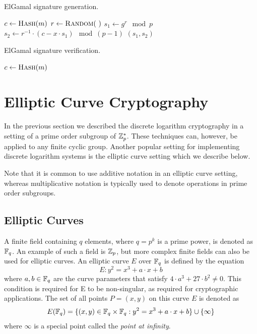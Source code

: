 \begin{algorithm}
  \caption{ElGamal signature generation.}
  \label{alg:ElGamal-sign}
  \addtolength{\baselineskip}{1mm}
  \begin{algorithmic}[1]
      \State $c \gets \Call{Hash}{m}$
      \State $r \gets \Call{Random}{~}$
      \State $s_1 \gets g^r \mod p$
      \State $s_2 \gets r^{-1} \cdot (c - x \cdot s_1) \mod (p - 1)$
      \Return $(s_1, s_2)$
    \EndFunction
  \end{algorithmic}
\end{algorithm}
\begin{algorithm}
  \caption{ElGamal signature verification.}
  \label{alg:ElGamal-verify}
  \addtolength{\baselineskip}{1mm}
  \begin{algorithmic}[1]
      \State $c \gets \Call{Hash}{m}$
        \Return {}
      \EndIf
      \Return {}
    \EndFunction
  \end{algorithmic}
\end{algorithm}

\section{Elliptic Curve Cryptography}

In the previous section we described the discrete logarithm cryptography in a
setting of a prime order subgroup of $\mathbb{Z}^*_p$. These techniques can, however,
be applied to any finite cyclic group. Another popular setting for implementing
discrete logarithm systems is the elliptic curve setting which we describe below.

Note that it is common to use additive notation in an elliptic curve setting,
whereas multiplicative notation is typically used to denote operations in prime
order subgroups.

\subsection{Elliptic Curves}

A finite field containing $q$ elements, where $q = p^k$ is a prime power, is
denoted as $\mathbb{F}_{q}$. An example of such a field is $\mathbb{Z}_p$, but more complex
finite fields can also be used for elliptic curves. An elliptic curve $E$ over
$\mathbb{F}_{q}$ is defined by the equation
\begin{equation}\label{eqn:elliptic_curve}
  E: y^2 = x^3 + a \cdot x + b
\end{equation}
where $a, b \in \mathbb{F}_{q}$ are the curve parameters that satisfy
$4 \cdot a^3 + 27 \cdot b^2 \neq 0$. This condition is required for E to be
non-singular, as required for cryptographic applications. The set of all points
$P = (x, y)$ on this curve $E$ is denoted as
\begin{equation*}
  E(\mathbb{F}_{q}) = \{ (x, y) \in \mathbb{F}_{q} \times \mathbb{F}_{q} : y^2 = x^3 + a \cdot x + b \}
                         \cup \{ \infty \}
\end{equation*}
where $\infty$ is a special point called the \emph{point at infinity}.


